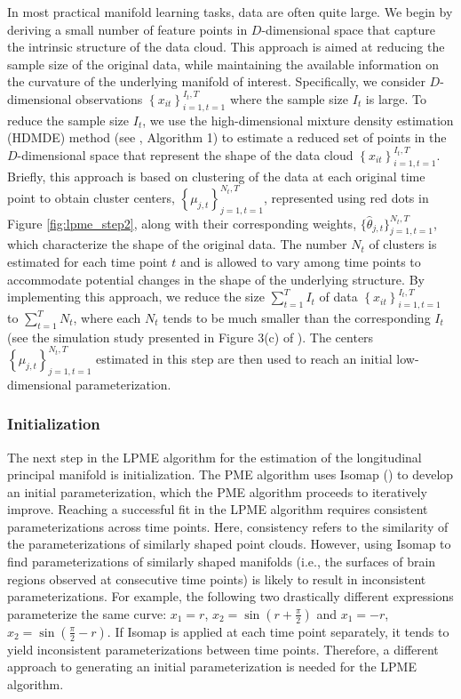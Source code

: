 \documentclass[12pt]{article}
\theoremstyle{definition}
\begin{document}
In most practical manifold learning tasks, data are often quite large. We begin by deriving a small number of feature points in $D$-dimensional space that capture the intrinsic structure of the data cloud. This approach is aimed at reducing the sample size of the original data, while maintaining the available information on the curvature of the underlying manifold of interest. Specifically, we consider $D$-dimensional observations $\left\{x_{it}\right\}_{i=1, t=1}^{I_t, T}$ where the sample size $I_t$ is large. To reduce the sample size $I_t$, we use the high-dimensional mixture density estimation (HDMDE) method (see \cite{mengPrincipalManifoldEstimation2021}, Algorithm 1) to estimate a reduced set of points in the $D$-dimensional space that represent the shape of the data cloud $\left\{x_{it}\right\}_{i=1, t=1}^{I_t, T}$. Briefly, this approach is based on clustering of the data at each original time point to obtain cluster centers, $\left\{\mu_{j, t}\right\}_{j=1, t=1}^{N_t, T}$, represented using red dots in Figure \ref{fig:lpme_step2}, along with their corresponding weights, $\{\hat{\theta}_{j, t}\}_{j=1, t=1}^{N_t, T}$, which characterize the shape of the original data. The number $N_t$ of clusters is estimated for each time point $t$ and is allowed to vary among time points to accommodate potential changes in the shape of the underlying structure. By implementing this approach, we reduce the size $\sum_{t=1}^T I_t$ of data $\left\{x_{it}\right\}_{i=1, t=1}^{I_t, T}$ to $\sum_{t=1}^T N_t$, where each $N_t$ tends to be much smaller than the corresponding $I_t$ (see the simulation study presented in Figure 3(c) of \cite{mengPrincipalManifoldEstimation2021}). The centers $\left\{\mu_{j, t}\right\}_{j=1, t=1}^{N_t, T}$ estimated in this step are then used to reach an initial low-dimensional parameterization.

\subsubsection{Initialization}

The next step in the LPME algorithm for the estimation of the longitudinal principal manifold is initialization. The PME algorithm uses Isomap (\cite{tenenbaumGlobalGeometricFramework2000}) to develop an initial parameterization, which the PME algorithm proceeds to iteratively improve. Reaching a successful fit in the LPME algorithm requires consistent parameterizations across time points. Here, consistency refers to the similarity of the parameterizations of similarly shaped point clouds. However, using Isomap to find parameterizations of similarly shaped manifolds (i.e., the surfaces of brain regions observed at consecutive time points) is likely to result in inconsistent parameterizations. For example, the following two drastically different expressions parameterize the same curve: $x_1 = r$, $x_2 = \sin(r + \frac{\pi}{2})$ and $x_1 = -r$, $x_2 = \sin(\frac{\pi}{2} - r)$. If Isomap is applied at each time point separately, it tends to yield inconsistent parameterizations between time points. Therefore, a different approach to generating an initial parameterization is needed for the LPME algorithm.
\end{document}

